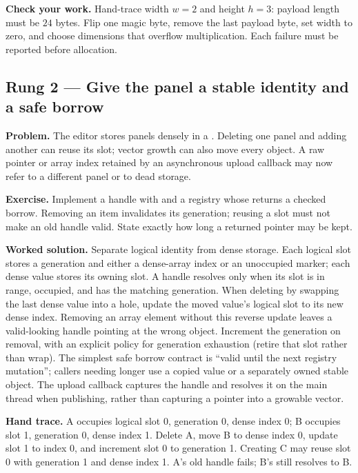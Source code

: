 \textbf{Check your work.} Hand-trace width \(w=2\) and height \(h=3\): payload length must be \(24\) bytes. Flip one magic byte, remove the last payload byte, set width to zero, and choose dimensions that overflow multiplication. Each failure must be reported before allocation.

\subsection{Rung 2 --- Give the panel a stable identity and a safe borrow}\label{02-foundations-ii-ch038-rung-2-give-the-panel-a-stable-identity-and-a-safe-borrow}

\hypertarget{02-foundations-ii-ch038-rung-2-give-the-panel-a-stable-identity-and-a-safe-borrow}{}

\textbf{Problem.} The editor stores panels densely in a . Deleting one panel and adding another can reuse its slot; vector growth can also move every object. A raw pointer or array index retained by an asynchronous upload callback may now refer to a different panel or to dead storage.

\textbf{Exercise.} Implement a handle with  and a registry whose  returns a checked borrow. Removing an item invalidates its generation; reusing a slot must not make an old handle valid. State exactly how long a returned pointer may be kept.

\textbf{Worked solution.} Separate logical identity from dense storage. Each logical slot stores a generation and either a dense-array index or an unoccupied marker; each dense value stores its owning slot. A handle resolves only when its slot is in range, occupied, and has the matching generation. When deleting by swapping the last dense value into a hole, update the moved value's logical slot to its new dense index. Removing an array element without this reverse update leaves a valid-looking handle pointing at the wrong object. Increment the generation on removal, with an explicit policy for generation exhaustion (retire that slot rather than wrap). The simplest safe borrow contract is ``valid until the next registry mutation''; callers needing longer use a copied value or a separately owned stable object. The upload callback captures the handle and resolves it on the main thread when publishing, rather than capturing a pointer into a growable vector.

\textbf{Hand trace.} A occupies logical slot 0, generation 0, dense index 0; B occupies slot 1, generation 0, dense index 1. Delete A, move B to dense index 0, update slot 1 to index 0, and increment slot 0 to generation 1. Creating C may reuse slot 0 with generation 1 and dense index 1. A's old  handle fails; B's  still resolves to B.

